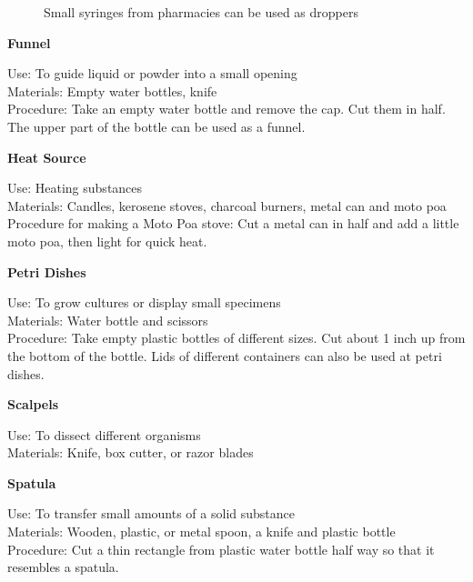 \begin{figure}[h]
\begin{center}
\def\svgwidth{3cm}

\caption{Small syringes from pharmacies can be used as droppers}
\label{fig:droppers}
\end{center}
\end{figure}

\begin{flushleft}
\textbf{Funnel}
\end{flushleft}
\vspace{-10pt}
Use: To guide liquid or powder into a small opening\\
Materials: Empty water bottles, knife\\
Procedure: Take an empty water bottle and remove the cap. Cut them in half. The upper part of the bottle can be used as a funnel.\\

\begin{flushleft}
\textbf{Heat Source}
\end{flushleft}
\vspace{-10pt}
Use: Heating substances\\
Materials: Candles, kerosene stoves, charcoal burners, metal can and moto poa\\
Procedure for making a Moto Poa stove: Cut a metal can in half and add a little moto poa, then light for quick heat.\\


\begin{flushleft}
\textbf{Petri Dishes}
\end{flushleft}
\vspace{-10pt}
Use: To grow cultures or display small specimens\\
Materials: Water bottle and scissors\\
Procedure: Take empty plastic bottles of different sizes. Cut about 1 inch up from the bottom of the bottle. Lids of different containers can also be used at petri dishes.\\

\begin{flushleft}
\textbf{Scalpels}
\end{flushleft}
\vspace{-10pt}
Use: To dissect different organisms \\
Materials: Knife, box cutter, or razor blades\\


\begin{flushleft}
\textbf{Spatula}
\end{flushleft}
\vspace{-10pt}
Use: To transfer small amounts of a solid substance\\
Materials: Wooden, plastic, or metal spoon, a knife and plastic bottle\\
Procedure: Cut a thin rectangle from plastic water bottle half way so that it resembles a spatula.\\


